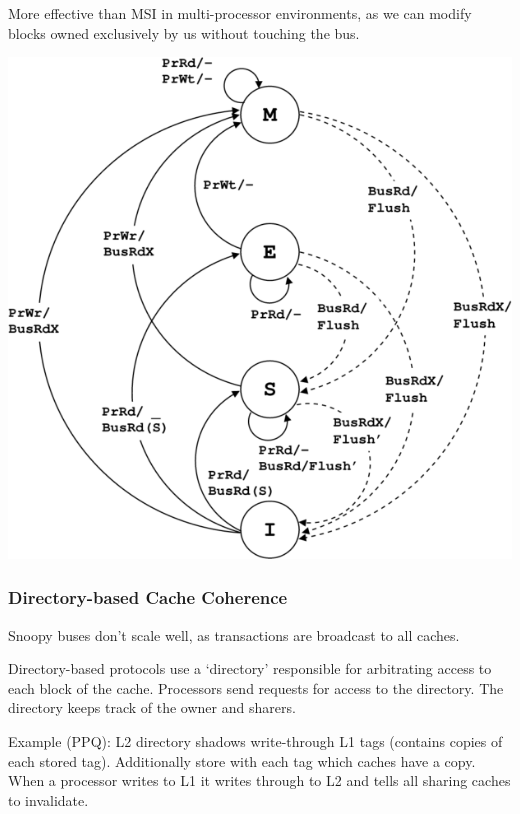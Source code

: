 \documentclass[a4paper, 11pt]{article}
\begin{document}
{{{\begin{minipage}[t]{0.35\textwidth}
            More effective than MSI in multi-processor environments, as we can modify blocks owned exclusively by us without touching the bus.
            \end{minipage}
            \begin{minipage}[t]{0.55\textwidth}
            \vspace{0pt}
            \centering
            \includegraphics[width=\textwidth]{mesi.png}
            \end{minipage}
        }
        \subsubsection*{Directory-based Cache Coherence}
        {
            Snoopy buses don't scale well, as transactions are broadcast to all caches.

            Directory-based protocols use a `directory' responsible for arbitrating access to each block of the cache. Processors send requests for access to the directory. The directory keeps track of the owner and sharers.

            Example (PPQ): L2 directory shadows write-through L1 tags (contains copies of each stored tag). Additionally store with each tag which caches have a copy. When a processor writes to L1 it writes through to L2 and tells all sharing caches to invalidate.
        }
    }
}
\end{document}
